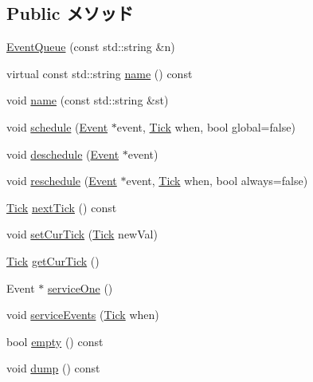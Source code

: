 \subsection*{Public メソッド}
\begin{DoxyCompactItemize}
\item 
\hyperlink{classEventQueue_a6034f8afa29a6178a4b6d0e371344d0d}{EventQueue} (const std::string \&n)
\item 
virtual const std::string \hyperlink{classEventQueue_adbcff144e5e199d332a1352af1798148}{name} () const 
\item 
void \hyperlink{classEventQueue_a413b79e026328fa4210d327d1958bd12}{name} (const std::string \&st)
\item 
void \hyperlink{classEventQueue_a6e13c0d68fbc26df6eff27313813b8a4}{schedule} (\hyperlink{classEvent}{Event} $\ast$event, \hyperlink{base_2types_8hh_a5c8ed81b7d238c9083e1037ba6d61643}{Tick} when, bool global=false)
\item 
void \hyperlink{classEventQueue_ab1b8fc2b2605fdc1d88bf07a86e1fe07}{deschedule} (\hyperlink{classEvent}{Event} $\ast$event)
\item 
void \hyperlink{classEventQueue_a676294f5f01031f3dfdf956185390db8}{reschedule} (\hyperlink{classEvent}{Event} $\ast$event, \hyperlink{base_2types_8hh_a5c8ed81b7d238c9083e1037ba6d61643}{Tick} when, bool always=false)
\item 
\hyperlink{base_2types_8hh_a5c8ed81b7d238c9083e1037ba6d61643}{Tick} \hyperlink{classEventQueue_ac7fc06f25478db3060a43a096e023243}{nextTick} () const 
\item 
void \hyperlink{classEventQueue_abc2f41fbb4828612a2637268ab8ce640}{setCurTick} (\hyperlink{base_2types_8hh_a5c8ed81b7d238c9083e1037ba6d61643}{Tick} newVal)
\item 
\hyperlink{base_2types_8hh_a5c8ed81b7d238c9083e1037ba6d61643}{Tick} \hyperlink{classEventQueue_ab9e4d6c1f3218aee0ff70854de959a6c}{getCurTick} ()
\item 
Event $\ast$ \hyperlink{classEventQueue_a95b9c78d6fb18e716e5d13362b609798}{serviceOne} ()
\item 
void \hyperlink{classEventQueue_adc925eabe90846085072915cc6c544c2}{serviceEvents} (\hyperlink{base_2types_8hh_a5c8ed81b7d238c9083e1037ba6d61643}{Tick} when)
\item 
bool \hyperlink{classEventQueue_ac6e61de369e994009e36f344f99c15ad}{empty} () const 
\item 
void \hyperlink{classEventQueue_a4a4fecb6d7cd9d0b8eb6579eee183af8}{dump} () const 
\item 

\end{DoxyCompactItemize}
